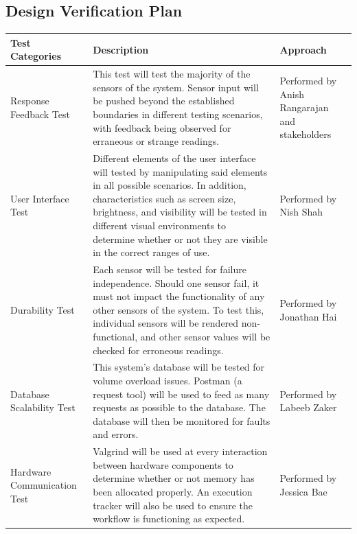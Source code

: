 \documentclass[12pt, titlepage]{article}
\begin{document}
\pagebreak

\subsection{Design Verification Plan}
\begin{tabular}{|p{4cm}|p{8cm}|p{4cm}|}
  \hline
  \label{sec_4_3}\textbf{Test Categories} & \textbf{Description}                                                                                                                                                                                                                                                                                                 & \textbf{Approach}                      \\
  \hline
  Response Feedback Test                  & This test will test the majority of the sensors of the system. Sensor input will be pushed beyond the established boundaries in different testing scenarios, with feedback being observed for erraneous or strange readings.
 & Performed by Anish Rangarajan and stakeholders\\
  \hline
  User Interface Test                     & Different elements of the user interface will tested by manipulating said elements in all possible scenarios. In addition, characteristics such as screen size, brightness, and visibility will be tested in different visual environments to determine whether or not they are visible in the correct ranges of use.                                                                                                              & Performed by Nish Shah                \\
  \hline
  Durability Test                         & Each sensor will be tested for failure independence. Should one sensor fail, it must not impact the functionality of any other sensors of the system. To test this, individual sensors will be rendered non-functional, and other sensor values will be checked for erroneous readings.                                                                         & Performed by Jonathan Hai                \\
  \hline
  Database Scalability Test               & This system's database will be tested for volume overload issues. Postman (a request tool) will be used to feed as many requests as possible to the database. The database will then be monitored for faults and errors. & Performed by Labeeb Zaker                \\
  \hline
  Hardware Communication Test                & Valgrind will be used at every interaction between hardware components to determine whether or not memory has been allocated properly. An execution tracker will also be used to ensure the workflow is functioning as expected.                                                                                                          & Performed by Jessica Bae                \\
  \hline
\end{tabular}
\end{document}
